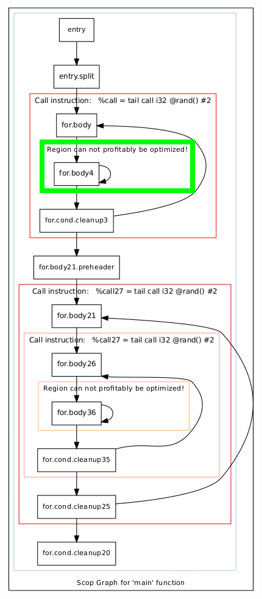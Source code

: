 \documentclass[aspectratio=169, xcolor=dvipsnames]{beamer}
\begin{document}
{\begin{frame}
        \includegraphics[height=1.2\textheight]{gfx/matmulScops(3).png}
    \end{frame}
    \begin{frame}
        \vspace*{-1.5cm}
        \centering

\end{frame}}
\end{document}
